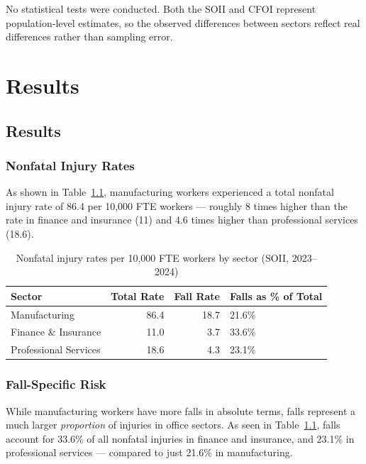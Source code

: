\documentclass[
  letterpaper,
  DIV=11,
  numbers=noendperiod]{scrreprt}
\begin{document}
No statistical tests were conducted. Both the SOII and CFOI represent
population-level estimates, so the observed differences between sectors
reflect real differences rather than sampling error.


\chapter{Results}\label{results}

\section{Results}\label{results-1}

\subsection{Nonfatal Injury Rates}\label{nonfatal-injury-rates}

As shown in Table~\ref{tbl-nonfatal}, manufacturing workers experienced
a total nonfatal injury rate of 86.4 per 10,000 FTE workers --- roughly
8 times higher than the rate in finance and insurance (11) and 4.6 times
higher than professional services (18.6).

\begin{longtable}[]{@{}lrrl@{}}

\caption{\label{tbl-nonfatal}Nonfatal injury rates per 10,000 FTE
workers by sector (SOII, 2023--2024)}

\tabularnewline

\toprule\noalign{}
Sector & Total Rate & Fall Rate & Falls as \% of Total \\
\midrule\noalign{}
\endhead
\bottomrule\noalign{}
\endlastfoot
Manufacturing & 86.4 & 18.7 & 21.6\% \\
Finance \& Insurance & 11.0 & 3.7 & 33.6\% \\
Professional Services & 18.6 & 4.3 & 23.1\% \\

\end{longtable}

\subsection{Fall-Specific Risk}\label{fall-specific-risk}

While manufacturing workers have more falls in absolute terms, falls
represent a much larger \emph{proportion} of injuries in office sectors.
As seen in Table~\ref{tbl-nonfatal}, falls account for 33.6\% of all
nonfatal injuries in finance and insurance, and 23.1\% in professional
services --- compared to just 21.6\% in manufacturing.
\end{document}
